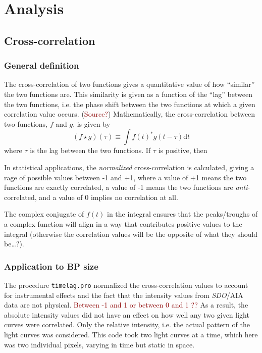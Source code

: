 \documentclass[preprint]{aastex}   %
\begin{document}
\section{Analysis}\label{analysis}
\subsection{Cross-correlation}\label{cross-correlation}
\subsubsection{General definition}

The cross-correlation of two functions gives a quantitative value of how
``similar'' the two functions are. This similarity is given as a function of the
``lag'' between the two functions, i.e. the phase shift between the two functions
at which a given correlation value occurs. (\textcolor{darkred}{Source?})
Mathematically, the cross-correlation between two functions, $f$ and $g$, is
given by
\begin{equation}
    ( f \star g )(\tau) \equiv \int{ f(t)^{*} g(t-\tau) \mathrm{d}t }
\end{equation}
where $\tau$ is the lag between the two functions. If $\tau$ is positive, then

In statistical applications, the \textit{normalized} cross-correlation is calculated,
giving a rage of possible values
between -1 and +1, where a value of
+1 means the two functions are exactly correlated, a value of
-1 means the two functions are \emph{anti}-correlated,
and a value of 0 implies no correlation at all.

The complex conjugate of $f(t)$ in the integral ensures that the peaks/troughs
of a complex function will align in a way that contributes positive values to the
integral (otherwise the correlation values will be the opposite of what they
should be\ldots?).


\subsubsection{Application to BP size}

The procedure \verb|timelag.pro| normalized the cross-correlation values
to account for instrumental effects and the fact that the intensity values
from \textit{SDO}/AIA data are not physical.
\textcolor{darkred}{Between -1 and 1 or between 0 and 1 ??}
As a result, the absolute intensity values did not have an effect on how
well any two given light curves were correlated. Only the relative intensity,
i.e. the actual pattern of the light curves was considered.
This code took two light curves at a time, which here was two individual pixels, varying in
time but static in space.
\end{document}
